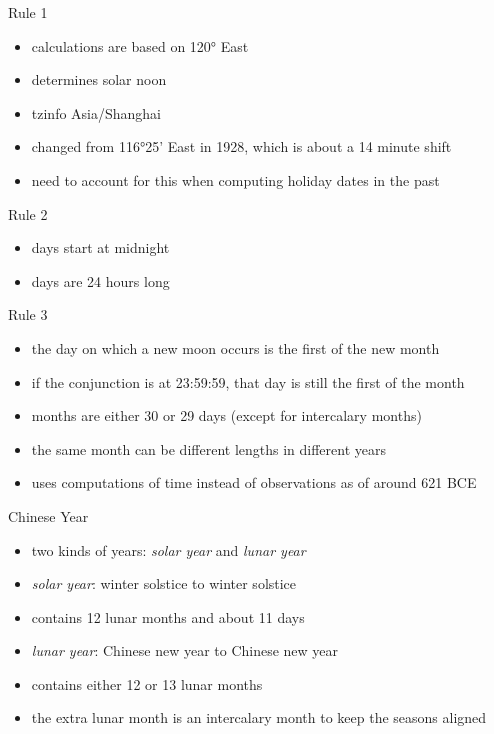 \documentclass[table]{beamer}
\begin{document}
\begin{frame}{Rule 1}
  \begin{itemize}
  \item<+-> calculations are based on 120° East
  \item<+-> determines solar noon
  \item<+-> tzinfo Asia/Shanghai
  \item<+-> changed from 116°25' East in 1928, which is about a 14 minute shift
  \item<+-> need to account for this when computing holiday dates in the past
  \end{itemize}
\end{frame}

\begin{frame}{Rule 2}
  \begin{itemize}
  \item<+-> days start at midnight
  \item<+-> days are 24 hours long
  \end{itemize}
\end{frame}

\begin{frame}{Rule 3}
  \begin{itemize}
  \item<+-> the day on which a new moon occurs is the first of the new month
  \item<+-> if the conjunction is at 23:59:59, that day is still the first of the
    month
  \item<+-> months are either 30 or 29 days (except for intercalary months)
  \item<+-> the same month can be different lengths in different years
  \item<+-> uses computations of  time instead of observations as of
    around 621 BCE
  \end{itemize}
\end{frame}

\begin{frame}{Chinese Year}
  \begin{itemize}
  \item<+-> two kinds of years: \textit{solar year} and \textit{lunar year}
  \item<+-> \textit{solar year}: winter solstice to winter solstice
  \item<+-> contains 12 lunar months and about 11 days
  \item<+-> \textit{lunar year}: Chinese new year to Chinese new year
  \item<+-> contains either 12 or 13 lunar months
  \item<+-> the extra lunar month is an intercalary month to keep the seasons
    aligned
  \end{itemize}
\end{frame}
\end{document}
